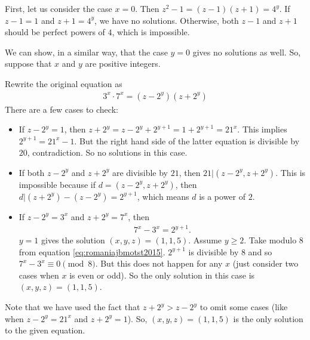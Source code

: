 \documentclass{subfile}
\begin{document}
				\begin{solution}
					First, let us consider the case $x=0$. Then $z^2-1 =(z-1)(z+1)=4^y$. If $z-1=1$ and $z+1=4^y$, we have no solutions. Otherwise, both $z-1$ and $z+1$ should be perfect powers of $4$, which is impossible.

					We can show, in a similar way, that the case $y=0$ gives no solutions as well. So, suppose that $x$ and $y$ are positive integers.

					Rewrite the original equation as
						\begin{align*}
							3^x \cdot 7^x = (z-2^y)(z+2^y)
						\end{align*}
					There are a few cases to check:
						\begin{itemize}
							\item If $z-2^y=1$, then $z+2^y = z-2^y+2^{y+1}=1+2^{y+1}=21^x$. This implies $2^{y+1}=21^x-1$. But the right hand side of the latter equation is divisible by $20$, contradiction. So no solutions in this case.

							\item If both $z-2^y$ and $z+2^y$ are divisible by $21$, then $21|(z-2^y, z+2^y)$. This is impossible because if $d=(z-2^y, z+2^y)$, then $d|(z+2^y) -(z-2^y)=2^{y+1}$, which means $d$ is a power of $2$.

							\item If $z-2^y=3^x$ and $z+2^y=7^x$, then
								\begin{align}\label{eq:romaniajbmotst2015}
									7^x-3^x=2^{y+1}.
								\end{align}
							 $y=1$ gives the solution $(x,y,z)=(1,1,5)$. Assume $y \geq 2$. Take modulo $8$ from equation \eqref{eq:romaniajbmotst2015}. $2^{y+1}$ is divisible by $8$ and so $7^x-3^x \equiv 0 \pmod 8$. But this does not happen for any $x$ (just consider two cases when $x$ is even or odd). So the only solution in this case is $(x,y,z)=(1,1,5)$.
						\end{itemize}
					Note that we have used the fact that $z+2^y > z-2^y$ to omit some cases (like when $z-2^y=21^x$ and $z+2^y = 1$). So, $(x,y,z)=(1,1,5)$ is the only solution to the given equation.
				\end{solution}
\end{document}

